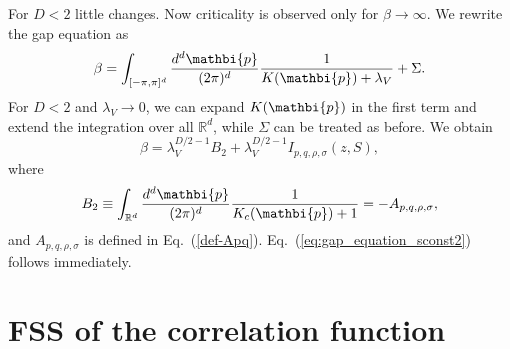 \documentclass[a4paper,12pt]{article}
\newcommand{\pos}[1]{\mathbi{#1}}
\begin{document}
{For $D<2$ little changes. Now criticality is observed only for 
$\beta\rightarrow\infty$. We rewrite the gap equation as
\begin{equation}
\label{eq:app-gapeq2}
\beta =
   \int_{[-\pi,\pi]^d}
   \frac{d^d\pos{p}}{(2\pi)^d} \frac{1}{K(\pos{p})+\lambda_V} +
    \Sigma .
\end{equation}
For $D<2$ and $\lambda_V\rightarrow 0$, we can expand $K(\pos{p})$ in the 
first term and extend the integration over all $\mathbb{R}^d$, while
$\Sigma$ can be treated as before. We obtain
\begin{equation}
\beta = \lambda_V^{D/2-1} B_2 + \lambda_V^{D/2-1} I_{p,q,\rho,\sigma}(z,S),
\end{equation}
where
\begin{equation}
B_2 \equiv \int_{\mathbb{R}^d}
   \frac{d^d\pos{p}}{(2\pi)^d} \frac{1}{K_c(\pos{p})+ 1} = 
   - A_{p,q,\rho,\sigma},
\end{equation}
and $A_{p,q,\rho,\sigma}$ is defined in Eq.~(\ref{def-Apq}). 
Eq.~(\ref{eq:gap_equation_sconst2}) follows immediately.

\section{FSS of the correlation function}
\label{AppB}

}
\end{document}

